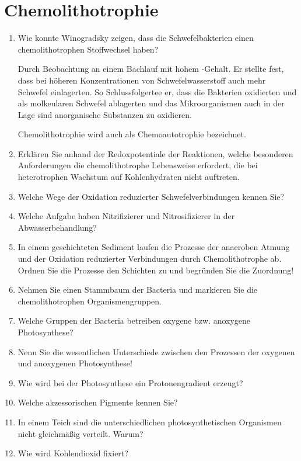 
\section{Chemolithotrophie}
\begin{enumerate}
	\item Wie konnte Winogradsky zeigen, dass die Schwefelbakterien einen chemolithotrophen Stoffwechsel haben?
		
		Durch Beobachtung an einem Bachlauf mit hohem -Gehalt.
		Er stellte fest,
		dass bei höheren Konzentrationen von Schwefelwasserstoff auch mehr Schwefel einlagerten.
		So Schlussfolgertee er,
		dass die Bakterien  oxidierten und als molkeularen Schwefel ablagerten
		und das Mikroorganismen auch in der Lage sind anorganische Substanzen zu oxidieren.

		Chemolithotrophie wird auch als Chemoautotrophie bezeichnet.

	\item Erklären Sie anhand der Redoxpotentiale der Reaktionen, welche besonderen Anforderungen die chemolithotrophe Lebensweise erfordert, die bei heterotrophen Wachstum auf Kohlenhydraten nicht auftreten.
	\item Welche Wege der Oxidation reduzierter Schwefelverbindungen kennen Sie?
	\item Welche Aufgabe haben Nitrifizierer und Nitrosifizierer in der Abwasserbehandlung?
	\item In einem geschichteten Sediment laufen die Prozesse der anaeroben Atmung und der Oxidation reduzierter Verbindungen durch Chemolithotrophe ab. Ordnen Sie die Prozesse den Schichten zu und begründen Sie die Zuordnung!
	\item Nehmen Sie einen Stammbaum der Bacteria und markieren Sie die chemolithotrophen Organismengruppen. 
	\item Welche Gruppen der Bacteria betreiben oxygene bzw. anoxygene Photosynthese?
	\item Nenn Sie die wesentlichen Unterschiede zwischen den Prozessen der oxygenen und anoxygenen Photosynthese!
	\item Wie wird bei der Photosynthese ein Protonengradient erzeugt?
	\item Welche akzessorischen Pigmente kennen Sie? 
	\item In einem Teich sind die unterschiedlichen photosynthetischen Organismen nicht gleichmäßig verteilt. Warum?
	\item Wie wird Kohlendioxid fixiert?
\end{enumerate}
